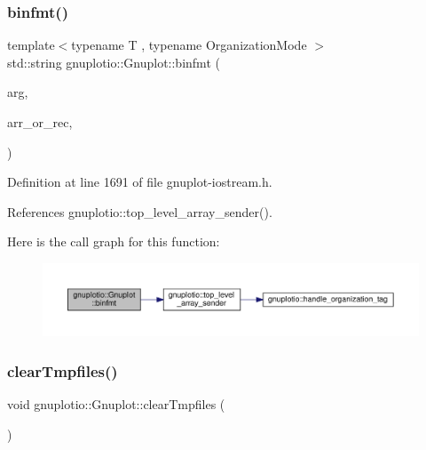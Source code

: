 \subsubsection{\texorpdfstring{binfmt()}{binfmt()}}
{\footnotesize\ttfamily template$<$typename T , typename Organization\+Mode $>$ \\
std\+::string gnuplotio\+::\+Gnuplot\+::binfmt (\begin{DoxyParamCaption}\item[{const T \&}]{arg,  }\item[{const std\+::string \&}]{arr\+\_\+or\+\_\+rec,  }\item[{Organization\+Mode}]{ }\end{DoxyParamCaption})\hspace{0.3cm}{\ttfamily [inline]}}



Definition at line 1691 of file gnuplot-\/iostream.\+h.



References gnuplotio\+::top\+\_\+level\+\_\+array\+\_\+sender().

Here is the call graph for this function\+:\nopagebreak
\begin{figure}[H]
\begin{center}
\leavevmode
\includegraphics[width=350pt]{classgnuplotio_1_1_gnuplot_a43fe103649ec168b453c43aecdacce81_cgraph}
\end{center}
\end{figure}
\mbox{\label{classgnuplotio_1_1_gnuplot_a0d62f80988c3db4413a668e366406393}} 
\subsubsection{\texorpdfstring{clear\+Tmpfiles()}{clearTmpfiles()}}
{\footnotesize\ttfamily void gnuplotio\+::\+Gnuplot\+::clear\+Tmpfiles (\begin{DoxyParamCaption}{ }\end{DoxyParamCaption})\hspace{0.3cm}{\ttfamily [inline]}}



